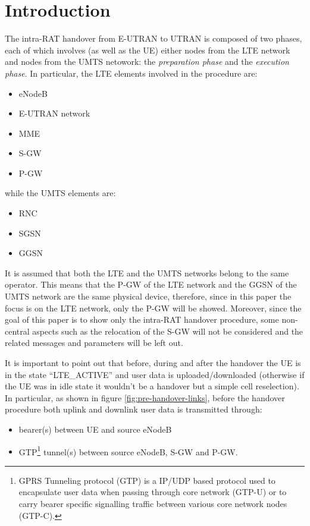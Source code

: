 \documentclass[12pt, a4paper]{article}
\begin{document}
\section{Introduction}
The intra-RAT handover from E-UTRAN to UTRAN is composed of two phases, each of
which involves (as well as the UE) either nodes from the LTE network and nodes
from the UMTS netowork: the \emph{preparation phase} and the \emph{execution phase}.
In particular, the LTE elements involved in the procedure are:
\begin{itemize}
  \item eNodeB
  \item E-UTRAN network
  \item MME
  \item S-GW
  \item P-GW
\end{itemize}
while the UMTS elements are:
\begin{itemize}
  \item RNC
  \item SGSN
  \item GGSN
\end{itemize}

It is assumed that both the LTE and the UMTS networks belong to the same
operator. This means that the P-GW of the LTE network and the GGSN of the UMTS
network are the same physical device, therefore, since in this paper the focus
is on the LTE network, only the P-GW will be showed. Moreover, since the goal
of this paper is to show only the intra-RAT handover procedure, some non-central
aspects such as the relocation of the S-GW will not be considered and the related
messages and parameters will be left out.

It is important to point out that before, during and after the handover the UE
is in the state ``LTE\_ACTIVE'' and user data is uploaded/downloaded (otherwise
if the UE was in idle state it wouldn't be a handover but a simple cell reselection).
In particular, as shown in figure \ref{fig:pre-handover-links}, before the handover procedure both uplink
and downlink user data is transmitted through:
\begin{itemize}
	\item bearer(s) between UE and source eNodeB
	\item GTP\footnote{GPRS Tunneling protocol (GTP) is a IP/UDP based protocol used to
	encapsulate user data when passing through core network (GTP-U) or to carry bearer
	specific signalling traffic between various core network nodes (GTP-C).}
  tunnel(s) between	source eNodeB, S-GW and P-GW.
\end{itemize}
\end{document}
